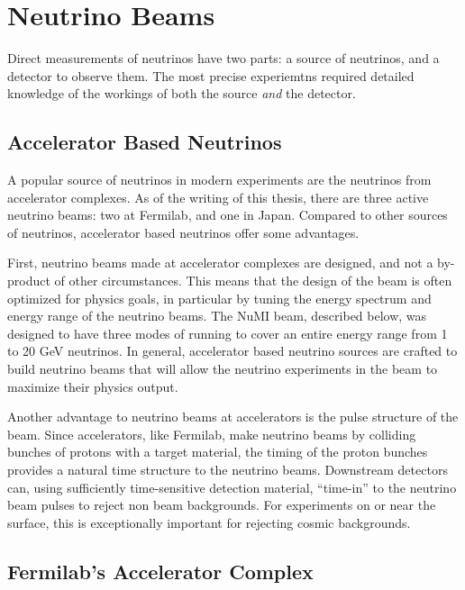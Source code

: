\chapter{\label{chp:beams} Neutrino Beams}

Direct measurements of neutrinos have two parts: a source of neutrinos, and a detector to observe them.  The most precise experiemtns required detailed knowledge of the workings of both the source {\em and} the detector.  


\section{Accelerator Based Neutrinos}

A popular source of neutrinos in modern experiments are the neutrinos from accelerator complexes.  As of the writing of this thesis, there are three active neutrino beams: two at Fermilab, and one in Japan.  Compared to other sources of neutrinos, accelerator based neutrinos offer some advantages.

First, neutrino beams made at accelerator complexes are designed, and not a by-product of other circumstances.  This means that the design of the beam is often optimized for physics goals, in particular by tuning the energy spectrum and energy range of the neutrino beams.  The NuMI beam, described below, was designed to have three modes of running to cover an entire energy range from 1 to 20 GeV neutrinos.  In general, accelerator based neutrino sources are crafted to build neutrino beams that will allow the neutrino experiments in the beam to maximize their physics output.

Another advantage to neutrino beams at accelerators is the pulse structure of the beam.  Since accelerators, like Fermilab, make neutrino beams by colliding bunches of protons with a target material, the timing of the proton bunches provides a natural time structure to the neutrino beams.  Downstream detectors can, using sufficiently time-sensitive detection material, ``time-in'' to the neutrino beam pulses to reject non beam backgrounds.  For experiments on or near the surface, this is exceptionally important for rejecting cosmic backgrounds.

\section{Fermilab's Accelerator Complex}

